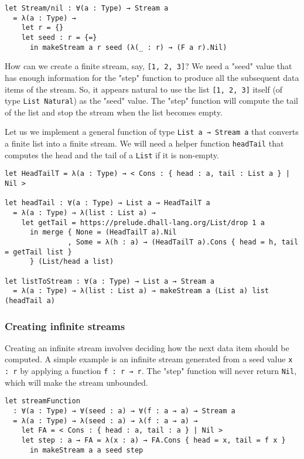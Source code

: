 \begin{lstlisting}[language=Dhall]
let Stream/nil : ∀(a : Type) → Stream a
  = λ(a : Type) → 
    let r = {}
    let seed : r = {=}
      in makeStream a r seed (λ(_ : r) → (F a r).Nil)
\end{lstlisting}


How can we create a finite stream, say, \lstinline![1, 2, 3]!?
We need a "seed" value that has enough information for the "step" function to produce all the subsequent data items of the stream.
So, it appears natural to use the list \lstinline![1, 2, 3]! itself (of type \lstinline!List Natural!) as the "seed" value.
The "step" function will compute the tail of the list and stop the stream when the list becomes empty.


Let us we implement a general function of type \lstinline!List a → Stream a! that converts a finite list into a finite stream.
We will need a helper function \lstinline!headTail! that computes the head and the tail of a \lstinline!List! if it is non-empty.


\begin{lstlisting}[language=Dhall]
let HeadTailT = λ(a : Type) → < Cons : { head : a, tail : List a } | Nil >

let headTail : ∀(a : Type) → List a → HeadTailT a
  = λ(a : Type) → λ(list : List a) →
    let getTail = https://prelude.dhall-lang.org/List/drop 1 a
      in merge { None = (HeadTailT a).Nil
               , Some = λ(h : a) → (HeadTailT a).Cons { head = h, tail = getTail list }
      } (List/head a list)

let listToStream : ∀(a : Type) → List a → Stream a
  = λ(a : Type) → λ(list : List a) → makeStream a (List a) list (headTail a)
\end{lstlisting}


\subsubsection{Creating infinite streams}


Creating an infinite stream involves deciding how the next data item should be computed.
A simple example is an infinite stream generated from a seed value \lstinline!x : r! by applying a function \lstinline!f : r → r!.
The "step" function will never return \lstinline!Nil!, which will make the stream unbounded.


\begin{lstlisting}[language=Dhall]
let streamFunction
  : ∀(a : Type) → ∀(seed : a) → ∀(f : a → a) → Stream a
  = λ(a : Type) → λ(seed : a) → λ(f : a → a) →
    let FA = < Cons : { head : a, tail : a } | Nil >
    let step : a → FA = λ(x : a) → FA.Cons { head = x, tail = f x }
      in makeStream a a seed step
\end{lstlisting}


